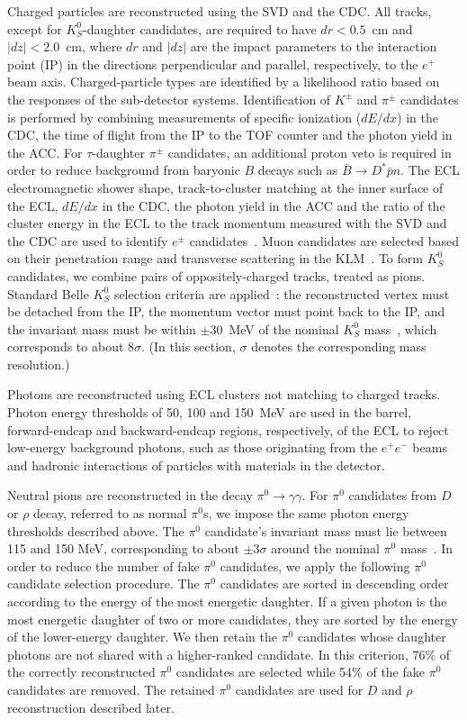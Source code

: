 \documentclass[aps,prd,twocolumn,superscriptaddress,showpacs,preprintnumbers,amsmath,amssymb]{revtex4-1}
\begin{document}
Charged particles are reconstructed using the SVD and the CDC. All tracks, except for $K_S^0$-daughter candidates, are required to have $dr < 0.5$~cm and $|dz| < 2.0$~cm, where $dr$ and $|dz|$ are the impact parameters to the interaction point (IP) in the directions perpendicular and parallel, respectively, to the $e^+$ beam axis. Charged-particle types are identified by a likelihood ratio based on the responses of the sub-detector systems. Identification of $K^{\pm}$ and $\pi^{\pm}$ candidates is performed by combining measurements of specific ionization ($dE/dx$) in the CDC, the time of flight from the IP to the TOF counter and the photon yield in the ACC. For $\tau$-daughter $\pi^{\pm}$ candidates, an additional proton veto is required in order to reduce background from baryonic $B$ decays such as ${\bar B} \rightarrow D^* {\bar p} n$. The ECL electromagnetic shower shape, track-to-cluster matching at the inner surface of the ECL, $dE/dx$ in the CDC, the photon yield in the ACC and the ratio of the cluster energy in the ECL to the track momentum measured with the SVD and the CDC are used to identify $e^{\pm}$ candidates~\cite{cite:eID:2002}. Muon candidates are selected based on their penetration range and transverse scattering in the KLM~\cite{cite:muID:2002}. To form $K_S^0$ candidates, we combine pairs of oppositely-charged tracks, treated as pions. Standard Belle $K_S^0$ selection criteria are applied~\cite{cite:Belle_KsKsKs:2005}: the reconstructed vertex must be detached from the IP, the momentum vector must point back to the IP, and the invariant mass must be within $\pm$30~MeV of the nominal $K_S^0$ mass~\cite{cite:PDG:2016}, which corresponds to about 8$\sigma$. (In this section, $\sigma$ denotes the corresponding mass resolution.)

Photons are reconstructed using ECL clusters not matching to charged tracks. Photon energy thresholds of 50, 100 and 150~MeV are used in the barrel, forward-endcap and backward-endcap regions, respectively, of the ECL to reject low-energy background photons, such as those originating from the $e^+ e^-$ beams and hadronic interactions of particles with materials in the detector.

Neutral pions are reconstructed in the decay $\pi^0 \to \gamma\gamma$. For $\pi^0$ candidates from $D$ or $\rho$ decay, referred to as normal $\pi^0$s, we impose the same photon energy thresholds described above. The $\pi^0$ candidate's invariant mass must lie between 115 and 150 MeV, corresponding to about $\pm 3\sigma$ around the nominal $\pi^0$ mass~\cite{cite:PDG:2016}. In order to reduce the number of fake $\pi^0$ candidates, we apply the following $\pi^0$ candidate selection procedure. The $\pi^0$ candidates are sorted in descending order according to the energy of the most energetic daughter. If a given photon is the most energetic daughter of two or more candidates, they are sorted by the energy of the lower-energy daughter. We then retain the $\pi^0$ candidates whose daughter photons are not shared with a higher-ranked candidate. In this criterion, 76\% of the correctly reconstructed $\pi^0$ candidates are selected while 54\% of the fake $\pi^0$ candidates are removed. The retained $\pi^0$ candidates are used for $D$ and $\rho$ reconstruction described later.
\end{document}
